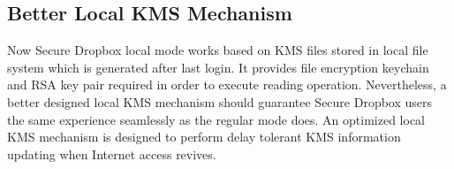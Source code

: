 \subsection{Better Local KMS Mechanism}

Now Secure Dropbox local mode works based on KMS files stored in local file system which is generated after last login. It provides file encryption keychain and RSA key pair required in order to execute reading operation. Nevertheless, a better designed local KMS mechanism should guarantee Secure Dropbox users the same experience seamlessly as the regular mode does. An optimized local KMS mechanism is designed to perform delay tolerant KMS information updating when Internet access revives. 
